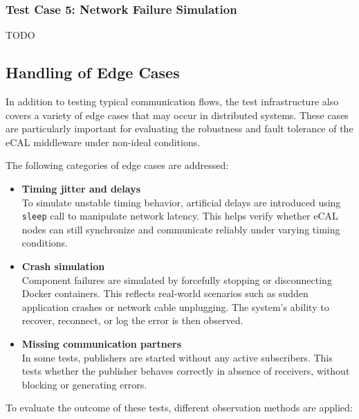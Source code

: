 \subsubsection*{Test Case 5: Network Failure Simulation}

TODO

\newpage
\subsection{Handling of Edge Cases}

In addition to testing typical communication flows, the test infrastructure also covers a variety of edge cases that may occur in distributed systems. These cases are particularly important for evaluating the robustness and fault tolerance of the eCAL middleware under non-ideal conditions.

\vspace{0.5em}
The following categories of edge cases are addressed:

\begin{itemize}
	\item \textbf{Timing jitter and delays} \\
	To simulate unstable timing behavior, artificial delays are introduced using \texttt{sleep} call to manipulate network latency. This helps verify whether eCAL nodes can still synchronize and communicate reliably under varying timing conditions.
	
	\item \textbf{Crash simulation} \\
	Component failures are simulated by forcefully stopping or disconnecting Docker containers. This reflects real-world scenarios such as sudden application crashes or network cable unplugging. The system’s ability to recover, reconnect, or log the error is then observed.
	
	\item \textbf{Missing communication partners} \\
	In some tests, publishers are started without any active subscribers. This tests whether the publisher behaves correctly in absence of receivers, without blocking or generating errors.
\end{itemize}

\vspace{0.5em}
To evaluate the outcome of these tests, different observation methods are applied:

